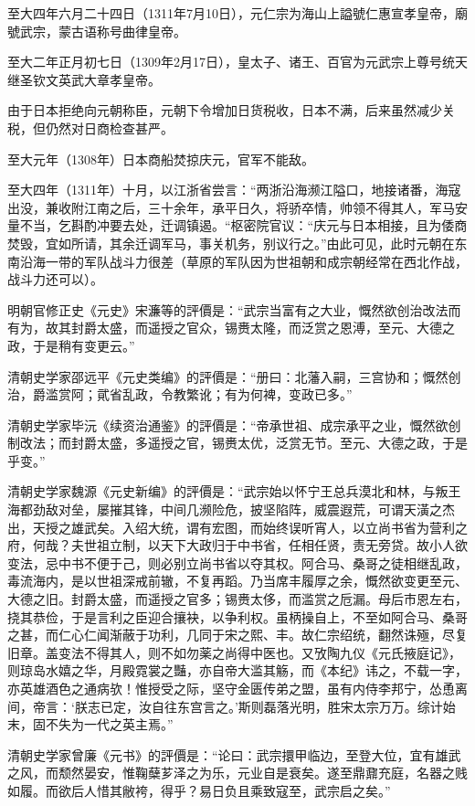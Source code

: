 至大四年六月二十四日（1311年7月10日），元仁宗为海山上謚號仁惠宣孝皇帝，廟號武宗，蒙古语称号曲律皇帝。

至大二年正月初七日（1309年2月17日），皇太子、诸王、百官为元武宗上尊号统天继圣钦文英武大章孝皇帝。

由于日本拒绝向元朝称臣，元朝下令增加日货税收，日本不满，后来虽然减少关税，但仍然对日商检查甚严。

至大元年（1308年）日本商船焚掠庆元，官军不能敌。

至大四年（1311年）十月，以江浙省尝言：“两浙沿海濒江隘口，地接诸番，海寇出没，兼收附江南之后，三十余年，承平日久，将骄卒情，帅领不得其人，军马安量不当，乞斟酌冲要去处，迁调镇遏。“枢密院官议：“庆元与日本相接，且为倭商焚毁，宜如所请，其余迁调军马，事关机务，别议行之。”由此可见，此时元朝在东南沿海一带的军队战斗力很差（草原的军队因为世祖朝和成宗朝经常在西北作战，战斗力还可以）。

明朝官修正史《元史》宋濂等的評價是：“武宗当富有之大业，慨然欲创治改法而有为，故其封爵太盛，而遥授之官众，锡赉太隆，而泛赏之恩溥，至元、大德之政，于是稍有变更云。”

清朝史学家邵远平《元史类编》的評價是：“册曰：北藩入嗣，三宫协和；慨然创治，爵滥赏阿；貮省乱政，令教繁讹；有为何裨，变政已多。”

清朝史学家毕沅《续资治通鉴》的評價是：“帝承世祖、成宗承平之业，慨然欲创制改法；而封爵太盛，多遥授之官，锡赉太优，泛赏无节。至元、大德之政，于是乎变。”

清朝史学家魏源《元史新编》的評價是：“武宗始以怀宁王总兵漠北和林，与叛王海都劲敌对垒，屡摧其锋，中间几濒险危，披坚陷阵，威震遐荒，可谓天潢之杰出，天授之雄武矣。入绍大统，谓有宏图，而始终误听宵人，以立尚书省为营利之府，何哉？夫世祖立制，以天下大政归于中书省，任相任贤，责无旁贷。故小人欲变法，忌中书不便于己，则必别立尚书省以夺其权。阿合马、桑哥之徒相继乱政，毒流海内，是以世祖深戒前辙，不复再蹈。乃当席丰履厚之余，慨然欲变更至元、大德之旧。封爵太盛，而遥授之官多；锡赉太侈，而滥赏之卮漏。母后市恩左右，挠其恭俭，于是言利之臣迎合攘袂，以争利权。虽柄操自上，不至如阿合马、桑哥之甚，而仁心仁闻渐蔽于功利，几同于宋之熙、丰。故仁宗绍统，翻然诛殛，尽复旧章。盖变法不得其人，则不如勿薬之尚得中医也。又攷陶九仪《元氏掖庭记》，则琼岛水嬉之华，月殿霓裳之豔，亦自帝大滥其觞，而《本纪》讳之，不载一字，亦英雄酒色之通病欤！惟授受之际，坚守金匮传弟之盟，虽有内侍李邦宁，怂恿离间，帝言：‘朕志已定，汝自往东宫言之。’斯则磊落光明，胜宋太宗万万。综计始末，固不失为一代之英主焉。”

清朝史学家曾廉《元书》的評價是：“论曰：武宗擐甲临边，至登大位，宜有雄武之风，而颓然晏安，惟鞠蘖芗泽之为乐，元业自是衰矣。遂至鼎鼐充庭，名器之贱如履。而欲后人惜其敝袴，得乎？易日负且乘致寇至，武宗启之矣。”

